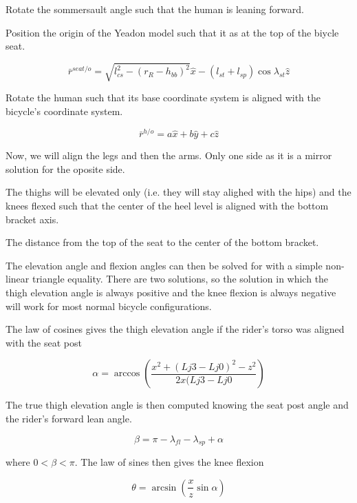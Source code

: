 \documentclass[10pt]{article}
\begin{document}
Rotate the sommersault angle such that the human is leaning forward.

Position the origin of the Yeadon model such that it as at the top of the
biycle seat.

\begin{equation}
  \bar{r}^{seat/o} = \sqrt{l_{cs}^2 - (r_R - h_{bb})^2} \hat{x} - (l_{st} + l_{sp})
  \operatorname{cos}\lambda_{st} \hat{z}
\end{equation}

Rotate the human such that its base coordinate system is aligned with the
bicycle's coordinate system.

\begin{equation}
  \bar{r}^{h/o} = a \hat{x} + b \hat{y} + c \hat{z}
\end{equation}

Now, we will align the legs and then the arms. Only one side as it is a mirror
solution for the oposite side.

The thighs will be elevated only (i.e. they will stay alighed with the hips)
and the knees flexed such that the center of the heel level is aligned with the
bottom bracket axis.

The distance from the top of the seat to the center of the bottom bracket.

The elevation angle and flexion angles can then be solved for with a simple
non-linear triangle equality. There are two solutions, so the solution in which
the thigh elevation angle is always positive and the knee flexion is always
negative will work for most normal bicycle configurations.

The law of cosines gives the thigh elevation angle if the rider's torso was
aligned with the seat post

\begin{equation}
	\alpha = \operatorname{arccos}\left(\frac{x^2 + (Lj3 - Lj0)^2 - z^2}{2x(Lj3 -
	Lj0}\right)
\end{equation}

The true thigh elevation angle is then computed knowing the seat post angle and
the rider's forward lean angle.

\begin{equation}
	\beta = \pi - \lambda_{fl} - \lambda_{sp} + \alpha
\end{equation}

where $0<\beta<\pi$. The law of sines then gives the knee flexion

\begin{equation}
	\theta = \operatorname{arcsin}\left(\frac{x}{z} \operatorname{sin}\alpha\right)
\end{equation}
\end{document}

